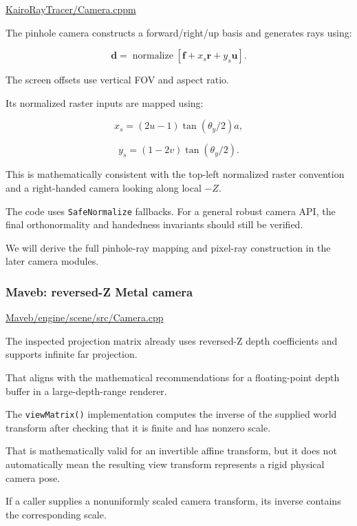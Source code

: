 \href{https://github.com/swayam8624/KairoRayTracer/blob/main/Camera.cppm?utm_source=chatgpt.com}{KairoRayTracer/Camera.cppm}

The pinhole camera constructs a forward/right/up basis and generates rays using:

\[
 \boxed{ \mathbf d= \operatorname{normalize} \left[ \mathbf f+ x_s\mathbf r+ y_s\mathbf u \right] }.
\]

The screen offsets use vertical FOV and aspect ratio.

Its normalized raster inputs are mapped using:

\[
 x_s=(2u-1)\tan(\theta_y/2)a,
\]

\[
 y_s=(1-2v)\tan(\theta_y/2).
\]

This is mathematically consistent with the top-left normalized raster convention and a right-handed camera looking along local \(-Z\).

The code uses \texttt{SafeNormalize} fallbacks. For a general robust camera API, the final orthonormality and handedness invariants should still be verified.

We will derive the full pinhole-ray mapping and pixel-ray construction in the later camera modules.

\subsubsection{Maveb: reversed-Z Metal camera}\label{02-foundations-ii-ch037-maveb-reversed-z-metal-camera}

\href{https://github.com/swayam8624/Maveb/blob/main/engine/scene/src/Camera.cpp?utm_source=chatgpt.com}{Maveb/engine/scene/src/Camera.cpp}

The inspected projection matrix already uses reversed-Z depth coefficients and supports infinite far projection.

That aligns with the mathematical recommendations for a floating-point depth buffer in a large-depth-range renderer.

The \texttt{viewMatrix()} implementation computes the inverse of the supplied world transform after checking that it is finite and has nonzero scale.

That is mathematically valid for an invertible affine transform, but it does not automatically mean the resulting view transform represents a rigid physical camera pose.

If a caller supplies a nonuniformly scaled camera transform, its inverse contains the corresponding scale.

